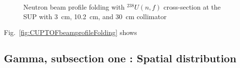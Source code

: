 \documentclass[12pt,journal]{IEEEtran}
\let\MYoriglatexcaption\caption
\renewcommand{\caption}[2][\relax]{\MYoriglatexcaption[#2]{#2}}
\begin{document}
\begin{figure}[!t]
	\centering
	\hfill
	\hfill
	\caption{Neutron beam profile folding with $^{238}U(n,f)$ cross-section at the SUP with \SI{3}{\cm}, \SI{10.2}{\cm}, and \SI{30}{\cm} collimator}
	\label{fig:SUPbeamprofileFolding}
\end{figure}

Fig.~\ref{fig:CUPTOFbeamprofileFolding} shows


\subsection{Gamma, subsection one : Spatial distribution}
\end{document}
